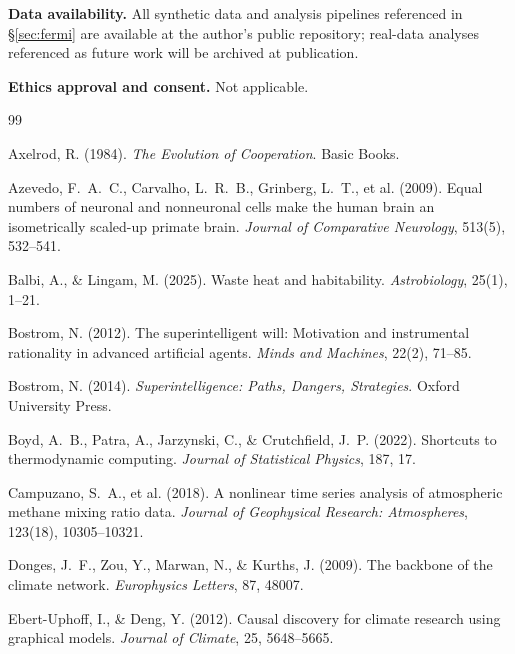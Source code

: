 \documentclass[11pt,a4paper,twocolumn]{article}
\begin{document}
\noindent\textbf{Data availability.} All synthetic data and analysis
pipelines referenced in \S\ref{sec:fermi} are available at the author's
public repository; real-data analyses referenced as future work will be
archived at publication.

\noindent\textbf{Ethics approval and consent.} Not applicable.


\small
\begin{thebibliography}{99}

 Axelrod, R. (1984). \textit{The Evolution of Cooperation}. Basic Books.

 Azevedo, F.~A.~C., Carvalho, L.~R.~B., Grinberg, L.~T., et al. (2009). Equal numbers of neuronal and nonneuronal cells make the human brain an isometrically scaled-up primate brain. \textit{Journal of Comparative Neurology}, 513(5), 532--541.

 Balbi, A., \& Lingam, M. (2025). Waste heat and habitability. \textit{Astrobiology}, 25(1), 1--21.

 Bostrom, N. (2012). The superintelligent will: Motivation and instrumental rationality in advanced artificial agents. \textit{Minds and Machines}, 22(2), 71--85.

 Bostrom, N. (2014). \textit{Superintelligence: Paths, Dangers, Strategies}. Oxford University Press.

 Boyd, A.~B., Patra, A., Jarzynski, C., \& Crutchfield, J.~P. (2022). Shortcuts to thermodynamic computing. \textit{Journal of Statistical Physics}, 187, 17.

 Campuzano, S.~A., et al. (2018). A nonlinear time series analysis of atmospheric methane mixing ratio data. \textit{Journal of Geophysical Research: Atmospheres}, 123(18), 10305--10321.

 Donges, J.~F., Zou, Y., Marwan, N., \& Kurths, J. (2009). The backbone of the climate network. \textit{Europhysics Letters}, 87, 48007.

 Ebert-Uphoff, I., \& Deng, Y. (2012). Causal discovery for climate research using graphical models. \textit{Journal of Climate}, 25, 5648--5665.


\end{thebibliography}
\end{document}
